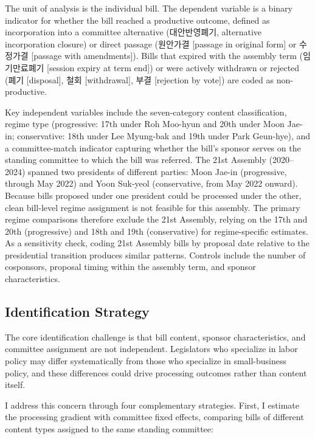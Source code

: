 \documentclass[11pt]{article}
\begin{document}
The unit of analysis is the individual bill. The dependent variable is a binary indicator for whether the bill reached a productive outcome, defined as incorporation into a committee alternative (대안반영폐기, alternative incorporation closure) or direct passage (원안가결 [passage in original form] or 수정가결 [passage with amendments]). Bills that expired with the assembly term (임기만료폐기 [session expiry at term end]) or were actively withdrawn or rejected (폐기 [disposal], 철회 [withdrawal], 부결 [rejection by vote]) are coded as non-productive.

Key independent variables include the seven-category content classification, regime type (progressive: 17th under Roh Moo-hyun and 20th under Moon Jae-in; conservative: 18th under Lee Myung-bak and 19th under Park Geun-hye), and a committee-match indicator capturing whether the bill's sponsor serves on the standing committee to which the bill was referred. The 21st Assembly (2020--2024) spanned two presidents of different parties: Moon Jae-in (progressive, through May 2022) and Yoon Suk-yeol (conservative, from May 2022 onward). Because bills proposed under one president could be processed under the other, clean bill-level regime assignment is not feasible for this assembly. The primary regime comparisons therefore exclude the 21st Assembly, relying on the 17th and 20th (progressive) and 18th and 19th (conservative) for regime-specific estimates. As a sensitivity check, coding 21st Assembly bills by proposal date relative to the presidential transition produces similar patterns. Controls include the number of cosponsors, proposal timing within the assembly term, and sponsor characteristics.

\subsection{Identification Strategy}

The core identification challenge is that bill content, sponsor characteristics, and committee assignment are not independent. Legislators who specialize in labor policy may differ systematically from those who specialize in small-business policy, and these differences could drive processing outcomes rather than content itself.

I address this concern through four complementary strategies. First, I estimate the processing gradient with committee fixed effects, comparing bills of different content types assigned to the same standing committee:
\end{document}

